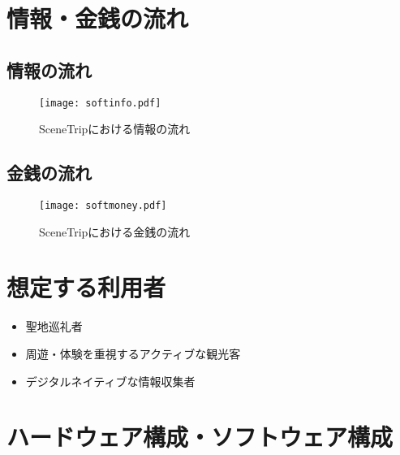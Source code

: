 \documentclass{docs}
\begin{document}
\section{情報・金銭の流れ}
\subsection{情報の流れ}
\begin{figure}[H]
	\centering
	\texttt{[image: softinfo.pdf]}
	\caption{SceneTripにおける情報の流れ}\label{fig:info}
\end{figure}

\subsection{金銭の流れ}
\begin{figure}[H]
	\centering
	\texttt{[image: softmoney.pdf]}
	\caption{SceneTripにおける金銭の流れ}\label{fig:money}
\end{figure}


\section{想定する利用者}
\begin{itemize}
	\item 聖地巡礼者
	\item 周遊・体験を重視するアクティブな観光客
	\item デジタルネイティブな情報収集者
\end{itemize}

\section{ハードウェア構成・ソフトウェア構成}
\end{document}
